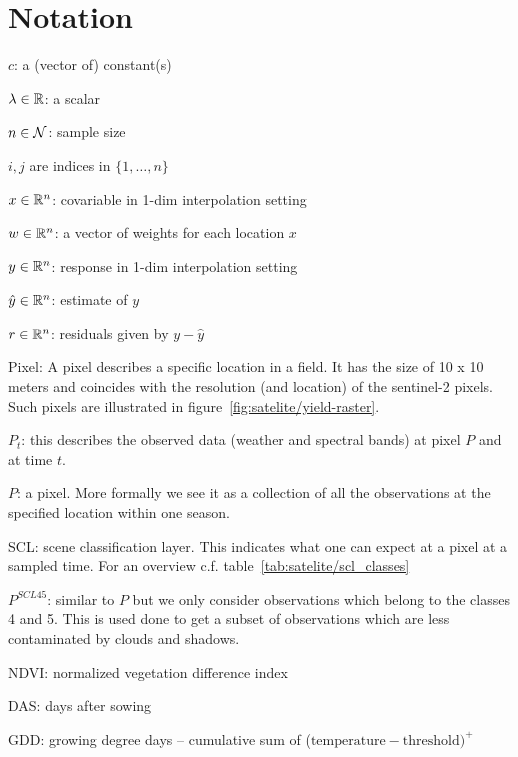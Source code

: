 \chapter*{Notation}
\label{c:Notation}

$c$: a (vector of) constant(s)

$\lambda \in \mathbb{R}$: a scalar

$n\in \operatorname{\mathcal{N}}$: sample size

$i,j$ are indices in $\{1,\dots,n\}$

$x\in \mathbb{R}^n$: covariable in 1-dim interpolation setting

$w \in \mathbb{R}^n$: a vector of weights for each location $x$

$y\in \mathbb{R}^n$: response in 1-dim interpolation setting

$\hat y\in \mathbb{R}^n$: estimate of $y$

$r \in \mathbb{R}^n$: residuals given by $y - \hat y$



Pixel: A pixel describes a specific location in a field. It has the size of 10 x 10 meters and coincides with the resolution (and location) of the sentinel-2 pixels. Such pixels are illustrated in figure~\ref{fig:satelite/yield-raster}.

$P_t$: this describes the observed data (weather and spectral bands) at pixel $P$ and at time $t$.

$P$: a pixel. More formally we see it as a collection of all the observations at the specified location within one season. %

SCL: scene classification layer. This indicates what one can expect at a pixel at a sampled time. For an overview c.f. table~\ref{tab:satelite/scl_classes}

$P^{SCL45}$: similar to $P$ but we only consider observations which belong to the classes 4 and 5. This is used done to get a subset of observations which are less contaminated by clouds and shadows.

NDVI: normalized vegetation difference index

DAS: days after sowing

GDD: growing degree days -- cumulative sum of ($\text{temperature}-\text{threshold})^+$


